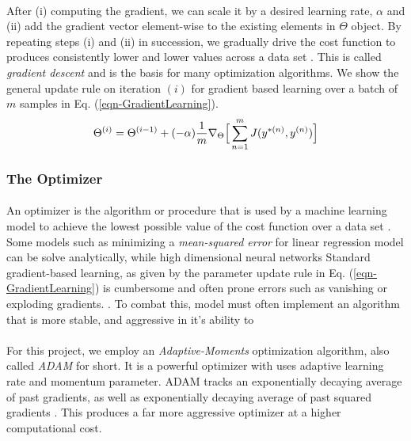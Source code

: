 \documentclass[12pt,letterpaper]{article}
\begin{document}
\paragraph*{}After (i) computing the gradient, we can scale it by a desired learning rate, $\alpha$ and (ii) add the gradient vector element-wise to the existing elements in $\Theta$ object. By repeating steps (i) and (ii) in succession, we gradually drive the cost function to produces consistently lower and lower values across a data set \cite{Geron}. This is called \textit{gradient descent} and is the basis for many optimization algorithms. We show the general update rule on iteration $(i)$ for gradient based learning over a batch of $m$ samples in Eq. (\ref{eqn-GradientLearning}).
\begin{equation}
\label{eqn-GradientLearning}
\Theta^{(i)} = \Theta^{(i-1)} + (-\alpha)\frac{1}{m} \nabla_{\Theta} \Big[\sum_{n=1}^{m} J(y^{*(n)},y^{(n)}) \Big] \\
\end{equation}


\subsubsection{The Optimizer}

\paragraph*{}An optimizer is the algorithm or procedure that is used by a machine learning model to achieve the lowest possible value of the cost function over a data set \cite{Geron}. Some models such as minimizing a \textit{mean-squared error} for linear regression model can be solve analytically, while high dimensional neural networks
Standard gradient-based learning, as given by the parameter update rule in Eq. (\ref{eqn-GradientLearning}) is cumbersome and often prone errors such as vanishing or exploding gradients. \cite{Geron,Goodfellow,Loy}. To combat this, model must often implement an algorithm that is more stable, and aggressive in it's ability to

\paragraph*{}For this project, we employ an \textit{Adaptive-Moments} optimization algorithm, also called \textit{ADAM} for short. It is a powerful optimizer with uses adaptive learning rate and momentum parameter. ADAM tracks an exponentially decaying average of past gradients, as well as exponentially decaying average of past squared gradients \cite{Geron}. This produces a far more aggressive optimizer at a higher computational cost.
\end{document}

